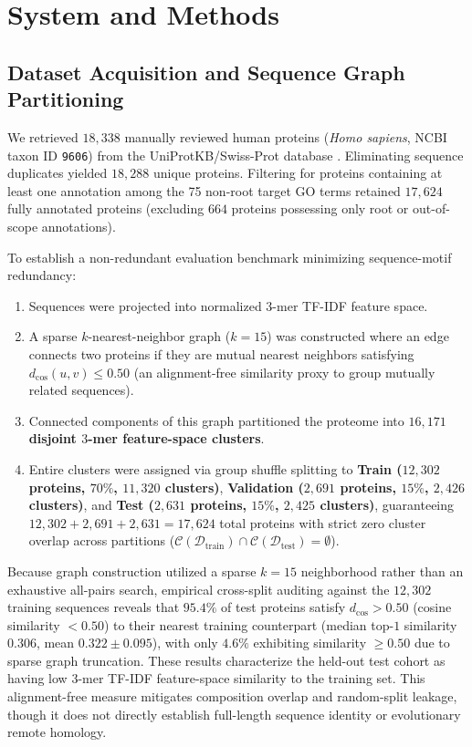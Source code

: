\documentclass[journal]{IEEEtran}
\begin{document}
\section{System and Methods}

\subsection{Dataset Acquisition and Sequence Graph Partitioning}
We retrieved $18,338$ manually reviewed human proteins (\textit{Homo sapiens}, NCBI taxon ID \texttt{9606}) from the UniProtKB/Swiss-Prot database \cite{uniprot2023, bairoch2000swiss}. Eliminating sequence duplicates yielded $18,288$ unique proteins. Filtering for proteins containing at least one annotation among the 75 non-root target GO terms retained $17,624$ fully annotated proteins (excluding $664$ proteins possessing only root or out-of-scope annotations).

To establish a non-redundant evaluation benchmark minimizing sequence-motif redundancy:
\begin{enumerate}
    \item Sequences were projected into normalized $3$-mer TF-IDF feature space.
    \item A sparse $k$-nearest-neighbor graph ($k=15$) was constructed where an edge connects two proteins if they are mutual nearest neighbors satisfying $d_{\cos}(u, v) \le 0.50$ (an alignment-free similarity proxy to group mutually related sequences).
    \item Connected components of this graph partitioned the proteome into \textbf{$16,171$ disjoint $3$-mer feature-space clusters}.
    \item Entire clusters were assigned via group shuffle splitting to \textbf{Train ($12,302$ proteins, $70\%$, $11,320$ clusters)}, \textbf{Validation ($2,691$ proteins, $15\%$, $2,426$ clusters)}, and \textbf{Test ($2,631$ proteins, $15\%$, $2,425$ clusters)}, guaranteeing $12,302 + 2,691 + 2,631 = 17,624$ total proteins with strict zero cluster overlap across partitions ($\mathcal{C}(\mathcal{D}_{\text{train}}) \cap \mathcal{C}(\mathcal{D}_{\text{test}}) = \emptyset$).
\end{enumerate}
Because graph construction utilized a sparse $k=15$ neighborhood rather than an exhaustive all-pairs search, empirical cross-split auditing against the $12,302$ training sequences reveals that $95.4\%$ of test proteins satisfy $d_{\cos} > 0.50$ (cosine similarity $< 0.50$) to their nearest training counterpart (median top-$1$ similarity $0.306$, mean $0.322 \pm 0.095$), with only $4.6\%$ exhibiting similarity $\ge 0.50$ due to sparse graph truncation. These results characterize the held-out test cohort as having low $3$-mer TF-IDF feature-space similarity to the training set. This alignment-free measure mitigates composition overlap and random-split leakage, though it does not directly establish full-length sequence identity or evolutionary remote homology.
\end{document}
